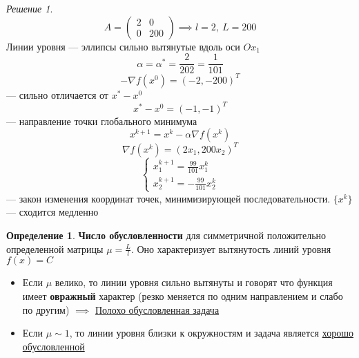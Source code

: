 \documentclass[english]{article}
\theoremstyle{plain}
\theoremstyle{remark}
\newtheorem*{solution}{Решение}
\theoremstyle{definition}
\newtheorem*{definition}{Определение}
\begin{document}
\begin{solution}
\[ A = \begin{pmatrix} 2 & 0 \\ 0 & 200 \end{pmatrix} \implies l = 2,\ L = 200\]
Линии уровня --- эллипсы сильно вытянутые вдоль оси \(Ox_1\)
\[ \alpha = \alpha^* = \frac{2}{202} = \frac{1}{101} \]
\[ -\nabla f(x^0) = (-2, -200)^T \]
--- сильно отличается от \(x^* - x^0\)
\[ x^* - x^0 = (-1, -1)^T \]
--- направление точки глобального минимума
\[ x^{k + 1} = x^k - \alpha \nabla f(x^k) \]
\[ \nabla f(x^k) = (2x_1, 200x_2)^T \]
\[ \begin{cases}
x_1^{k + 1} = \frac{99}{101} x_1^k \\
x_2^{k + 1} = - \frac{99}{101} x_2^k
\end{cases}\]
--- закон изменения координат точек, минимизирующей последовательности. \(\{x^k\}\) --- сходится медленно
\end{solution}
\begin{definition}
\textbf{Число обусловленности} для симметричной положительно определенной матрицы \(\mu = \frac{L}{l}\). Оно характеризует вытянутость линий уровня \(f(x) = C\)
\begin{itemize}
\item Если \(\mu\) велико, то линии уровня сильно вытянуты и говорят что функция имеет \textbf{овражный} характер (резко меняется по одним направлением и слабо по другим) \(\implies\) \uline{Полохо обусловленная задача}
\item Если \(\mu \sim 1\), то линии уровня близки к окружностям и задача является \uline{хорошо обусловленной}
\end{itemize}
\end{definition}
\end{document}
